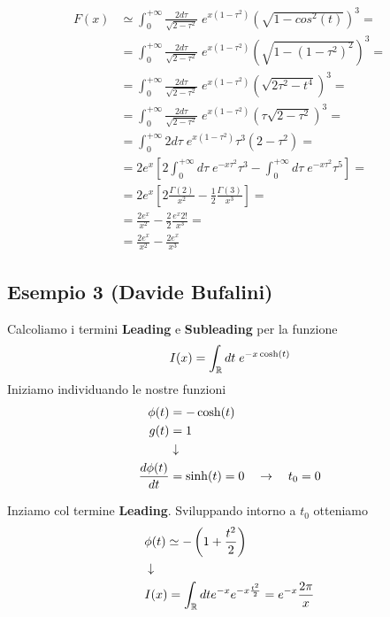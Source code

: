 \begin{align}
	F(x) &\simeq \int_{0}^{+\infty} \frac{2d\tau}{\sqrt{2-\tau^2}} \; e^{x\left(1- \tau^2\right)}(\sqrt{1-cos^2(t)})^3 = \nonumber\\
	&= \int_{0}^{+\infty} \frac{2d\tau}{\sqrt{2-\tau^2}} \; e^{x\left(1- \tau^2\right)}(\sqrt{1-(1-\tau^2)^2})^3 = \nonumber\\
	&=\int_{0}^{+\infty} \frac{2d\tau}{\sqrt{2-\tau^2}} \; e^{x\left(1- \tau^2\right)}(\sqrt{2\tau^2-t^4})^3 = \nonumber\\
	&=\int_{0}^{+\infty} \frac{2d\tau}{\sqrt{2-\tau^2}} \; e^{x\left(1- \tau^2\right)}(\tau\sqrt{2-\tau^2})^3 = \nonumber\\
	&=\int_{0}^{+\infty} 2d\tau \; e^{x\left(1- \tau^2\right)}\tau^3 (2-\tau^2) = \nonumber\\
	&=2e^x \left[ 2\int_{0}^{+\infty}d\tau \; e^{-x\tau^2} \tau^3 - \int_{0}^{+\infty} d\tau\; e^{-x\tau^2}\tau^5 \right] = \nonumber\\
	&= 2e^x\left[ 2\frac{\Gamma(2)}{x^2} - \frac{1}{2} \frac{\Gamma(3)}{x^3} \right] = \nonumber \\
	&= \frac{2e^x}{x^2} - \frac{2}{2} \frac{e^x 2!}{x^3} =\nonumber\\
	&= \frac{2e^x}{x^2} -\frac{2e^x}{x^3}
\end{align}

\newpage

\subsection{Esempio 3 (Davide Bufalini)}

Calcoliamo i termini \textbf{Leading} e \textbf{Subleading} per la funzione
\begin{align}
	I(x) = \int_{\mathbb{R}} dt \; e^{-x \cosh(t)}
\end{align}
Iniziamo individuando le  nostre funzioni
\begin{align}
	\phi(t) &= -\cosh(t)\\
	g(t) &= 1 \\ &\downarrow \nonumber \\
	\frac{d\phi(t)}{dt} &= \sinh(t) = 0 \quad \rightarrow \quad t_0 = 0
\end{align}

Inziamo col termine \textbf{Leading}. Sviluppando intorno a $t_0$ otteniamo
\begin{align}
	&\phi(t) \simeq -\left( 1 + \frac{t^2}{2} \right)\\ &\downarrow \nonumber \\
	&I(x) = \int_{\mathbb{R}} dt e^{-x}e^{-x \frac{t^2}{2}} = e^{-x} \frac{2\pi}{x}	
\end{align}

